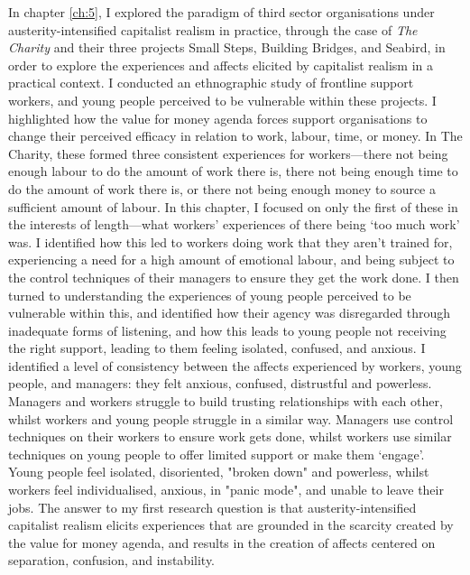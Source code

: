 In chapter \ref{ch:5}, I explored the paradigm of third sector organisations under austerity-intensified capitalist realism in practice, through the case of \textit{The Charity} and their three projects Small Steps, Building Bridges, and Seabird, in order to explore the experiences and affects elicited by capitalist realism in a practical context. I conducted an ethnographic study of frontline support workers, and young people perceived to be vulnerable within these projects. I highlighted how the value for money agenda forces support organisations to change their perceived efficacy in relation to work, labour, time, or money. In The Charity, these formed three consistent experiences for workers—there not being enough labour to do the amount of work there is, there not being enough time to do the amount of work there is, or there not being enough money to source a sufficient amount of labour. In this chapter, I focused on only the first of these in the interests of length—what workers' experiences of there being `too much work' was. I identified how this led to workers doing work that they aren't trained for, experiencing a need for a high amount of emotional labour, and being subject to the control techniques of their managers to ensure they get the work done. I then turned to understanding the experiences of young people perceived to be vulnerable within this, and identified how their agency was disregarded through inadequate forms of listening, and how this leads to young people not receiving the right support, leading to them feeling isolated, confused, and anxious. I identified a level of consistency between the affects experienced by workers, young people, and managers: they felt anxious, confused, distrustful and powerless. Managers and workers struggle to build trusting relationships with each other, whilst workers and young people struggle in a similar way. Managers use control techniques on their workers to ensure work gets done, whilst workers use similar techniques on young people to offer limited support or make them `engage'. Young people feel isolated, disoriented, "broken down" and powerless, whilst workers feel individualised, anxious, in "panic mode", and unable to leave their jobs. The answer to my first research question is that austerity-intensified capitalist realism elicits experiences that are grounded in the scarcity created by the value for money agenda, and results in the creation of affects centered on separation, confusion, and instability.

